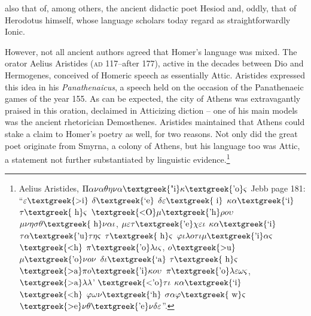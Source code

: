 \documentclass[output=paper]{langsci/langscibook}
\begin{document}
also that of, among others, the ancient didactic poet Hesiod and, oddly, that of Herodotus himself, whose language scholars today regard as straightforwardly Ionic.

However, not all ancient authors agreed that Homer’s language was mixed. The orator Aelius Aristides (\textsc{ad} 117–after 177), active in the decades between Dio and Hermogenes, conceived of Homeric speech as essentially Attic. Aristides expressed this idea in his \textit{Panathenaicus}, a speech held on the occasion of the Panathenaeic games of the year 155. As can be expected, the city of Athens was extravagantly praised in this oration, declaimed in Atticizing diction – one of his main models was the ancient rhetorician Demosthenes. Aristides maintained that Athens could stake a claim to Homer’s poetry as well, for two reasons. Not only did the great poet originate from Smyrna, a colony of Athens, but his language too was Attic, a statement not further substantiated by linguistic evidence.\footnote{Aelius Aristides, $\Pi \alpha \nu \alpha \theta \eta \nu \alpha \text{\textgreek{"i}}\kappa \text{\textgreek{'o}}\varsigma $ Jebb page 181: “$\varepsilon \text{\textgreek{>i}}$ $\delta \text{\textgreek{`e}}$ $\delta \varepsilon \text{\textgreek{~i}}$ $\kappa \alpha \text{\textgreek{`i}}$ $\tau \text{\textgreek{~h}}\varsigma $ $\text{\textgreek{<O}}\mu \text{\textgreek{'h}}\rho o\upsilon $ $\mu \nu \eta \sigma \theta \text{\textgreek{~h}}\nu \alpha \iota $, $\mu \varepsilon \tau \text{\textgreek{'e}}\chi \varepsilon \iota $ $\kappa \alpha \text{\textgreek{`i}}$ $\tau \alpha \text{\textgreek{'u}}\tau \eta \varsigma $ $\tau \text{\textgreek{~h}}\varsigma $ $\varphi \iota \lambda o\tau \iota \mu \text{\textgreek{'i}}\alpha \varsigma $ $\text{\textgreek{<h}}$ $\pi \text{\textgreek{'o}}\lambda \iota \varsigma $, $o\text{\textgreek{>u}}$ $\mu \text{\textgreek{'o}}\nu o\nu $ $\delta \iota \text{\textgreek{`a}}$ $\tau \text{\textgreek{~h}}\varsigma $ $\text{\textgreek{>a}}\pi o\text{\textgreek{'i}}\kappa o\upsilon $ $\pi \text{\textgreek{'o}}\lambda \varepsilon \omega \varsigma $, $\text{\textgreek{>a}}\lambda \lambda $’ $\text{\textgreek{<'o}}\tau \iota $ $\kappa \alpha \text{\textgreek{`i}}$ $\text{\textgreek{<h}}$ $\varphi \omega \nu \text{\textgreek{`h}}$ $\sigma \alpha \varphi \text{\textgreek{~w}}\varsigma $ $\text{\textgreek{>e}}\nu \theta \text{\textgreek{'e}}\nu \delta \varepsilon $”.}
\end{document}
